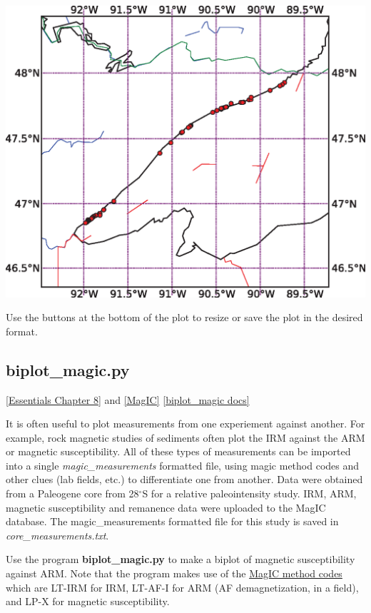 \documentclass[11pt]{book}
\begin{document}
{{{\includegraphics[width=15cm]{EPSfiles/basemap.eps}

  Use the buttons at the bottom of the plot to resize or save the plot in the desired format.  


\subsection{biplot\_magic.py} 
\label{ex:biplot_magic}
\href{http://magician.ucsd.edu/Essentials_2/WebBook2ch8.html#ch8}{
[Essentials Chapter 8]} and \href{#MagIC}{[MagIC]}
\href{http://earthref.org/PmagPy/pmagpydocs/biplot_magic-module.html}{[biplot\_magic docs]}

It is often useful to plot measurements from one experiement against another.  For example, rock magnetic studies of sediments often plot the IRM against the ARM or magnetic susceptibility.  All of these types of measurements can be imported into a single {\it magic\_measurements} formatted file, using magic method codes and other clues (lab fields, etc.) to differentiate one from another.  
Data  were obtained from a Paleogene core from 28$^{\circ}$S for a relative paleointensity study.    IRM, ARM, magnetic susceptibility and remanence data were uploaded to the MagIC database.  The magic\_measurements formatted file for this study is saved in {\it core\_measurements.txt}.  

Use the program {\bf biplot\_magic.py} to make a biplot of  magnetic susceptibility against ARM.  Note that the program makes use of the \href{#method_codes}{MagIC method codes} which are LT-IRM for IRM, LT-AF-I for ARM (AF demagnetization, in a field), and LP-X for magnetic susceptibility.  

}}}
\end{document}
